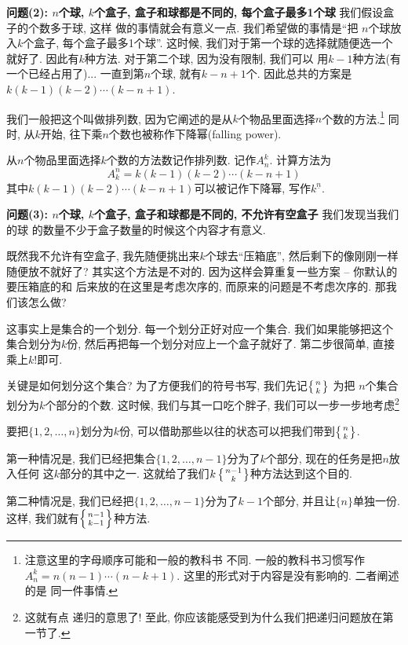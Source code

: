 \textbf{问题(2): $n$个球, $k$个盒子, 盒子和球都是不同的, 每个盒子最多1个球} 我们假设盒子的个数多于球, 这样
做的事情就会有意义一点. 
我们希望做的事情是``把 $n$个球放入$k$个盒子, 每个盒子最多1个球''.
这时候, 我们对于第一个球的选择就随便选一个就好了. 因此有$k$种方法. 对于第二个球, 因为没有限制, 我们可以
用$k-1$种方法(有一个已经占用了)...  一直到第$n$个球, 就有$k-n+1$个. 因此总共的方案是$k(k-1)(k-2)\cdots(k-n+1)$.

我们一般把这个叫做排列数, 因为它阐述的是从$k$个物品里面选择$n$个数的方法.\footnote{注意这里的字母顺序可能和一般的教科书
不同. 一般的教科书习惯写作$A_n^k=n(n-1)\cdots(n-k+1)$. 这里的形式对于内容是没有影响的. 二者阐述的是
同一件事情. } 
同时, 从$k$开始, 往下乘$n$个数也被称作下降幂(falling power). 

\begin{definition}[排列数]
  从$n$个物品里面选择$k$个数的方法数记作排列数. 记作$A_n^k$. 计算方法为
  $$
  A_k^n = k(k-1)(k-2)\cdots(k-n+1)
  $$
  其中$k(k-1)(k-2)\cdots(k-n+1)$可以被记作下降幂, 写作$k^{\underline n}$. 
\end{definition}

\textbf{问题(3): $n$个球, $k$个盒子, 盒子和球都是不同的, 不允许有空盒子} 我们发现当我们的球
的数量不少于盒子数量的时候这个内容才有意义. 

既然我不允许有空盒子, 我先随便挑出来$k$个球去``压箱底'', 然后剩下的像刚刚一样
随便放不就好了? 其实这个方法是不对的. 因为这样会算重复一些方案 -- 你默认的要压箱底的和
后来放的在这里是考虑次序的, 而原来的问题是不考虑次序的. 那我们该怎么做? 

这事实上是集合的一个划分. 每一个划分正好对应一个集合. 我们如果能够把这个集合划分为$k$份, 
然后再把每一个划分对应上一个盒子就好了. 第二步很简单, 直接乘上$k!$即可. 

关键是如何划分这个集合? 为了方便我们的符号书写, 我们先记$\left\{{n \atop k}\right\}$ 为把
$n$个集合划分为$k$个部分的个数. 这时候, 我们与其一口吃个胖子, 我们可以一步一步地考虑\footnote{这就有点
递归的意思了! 至此, 你应该能感受到为什么我们把递归问题放在第一节了. }

要把$\{1,2,\ldots,n\}$划分为$k$份, 可以借助那些以往的状态可以把我们带到$\left\{{n \atop k}\right\}$. 

第一种情况是, 我们已经把集合$\{1,2,\ldots,{n-1}\}$分为了$k$个部分, 现在的任务是把$n$放入任何
这$k$部分的其中之一. 这就给了我们$k\left\{{n-1 \atop k}\right\}$种方法达到这个目的. 

第二种情况是, 我们已经把$\{1,2,\ldots,{n-1}\}$分为了$k-1$个部分, 并且让$\{n\}$单独一份. 
这样, 我们就有$\left\{{n-1 \atop k-1}\right\}$种方法. 

